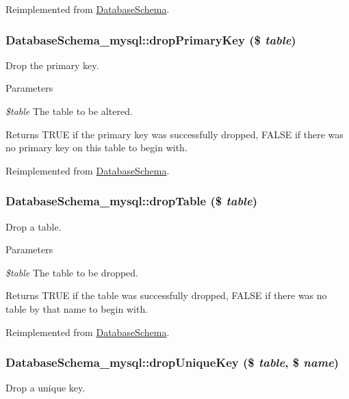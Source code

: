 Reimplemented from \hyperlink{classDatabaseSchema_adf5467aa59e462857527d8f1a5988a81}{DatabaseSchema}.\hypertarget{classDatabaseSchema__mysql_adf1b000bebd7b19a83506a01dab36972}{
\subsubsection[{dropPrimaryKey}]{\setlength{\rightskip}{0pt plus 5cm}DatabaseSchema\_\-mysql::dropPrimaryKey (\$ {\em table})}}
\label{classDatabaseSchema__mysql_adf1b000bebd7b19a83506a01dab36972}
Drop the primary key.


\begin{DoxyParams}{Parameters}
\item[{\em \$table}]The table to be altered.\end{DoxyParams}
\begin{DoxyReturn}{Returns}
TRUE if the primary key was successfully dropped, FALSE if there was no primary key on this table to begin with. 
\end{DoxyReturn}


Reimplemented from \hyperlink{classDatabaseSchema_a08057609758a32c13c4d1863da54b63e}{DatabaseSchema}.\hypertarget{classDatabaseSchema__mysql_a9dbfabde4257668bdeb08965735fb823}{
\subsubsection[{dropTable}]{\setlength{\rightskip}{0pt plus 5cm}DatabaseSchema\_\-mysql::dropTable (\$ {\em table})}}
\label{classDatabaseSchema__mysql_a9dbfabde4257668bdeb08965735fb823}
Drop a table.


\begin{DoxyParams}{Parameters}
\item[{\em \$table}]The table to be dropped.\end{DoxyParams}
\begin{DoxyReturn}{Returns}
TRUE if the table was successfully dropped, FALSE if there was no table by that name to begin with. 
\end{DoxyReturn}


Reimplemented from \hyperlink{classDatabaseSchema_a61a37e713374b88d28161e0ade1a5c78}{DatabaseSchema}.\hypertarget{classDatabaseSchema__mysql_a7301360fe0f030204827f75495448c41}{
\subsubsection[{dropUniqueKey}]{\setlength{\rightskip}{0pt plus 5cm}DatabaseSchema\_\-mysql::dropUniqueKey (\$ {\em table}, \/  \$ {\em name})}}
\label{classDatabaseSchema__mysql_a7301360fe0f030204827f75495448c41}
Drop a unique key.


